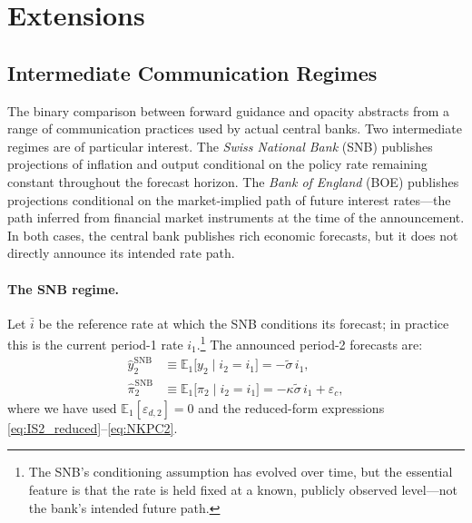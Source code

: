 
\section{Extensions}
\label{sec:extensions}

\subsection{Intermediate Communication Regimes}
\label{sec:intermediate}

The binary comparison between forward guidance and opacity abstracts from a range
of communication practices used by actual central banks. Two intermediate regimes
are of particular interest. The \emph{Swiss National Bank} (SNB) publishes
projections of inflation and output conditional on the policy rate remaining constant
throughout the forecast horizon. The \emph{Bank of England} (BOE) publishes
projections conditional on the market-implied path of future interest rates---the
path inferred from financial market instruments at the time of the announcement. In
both cases, the central bank publishes rich economic forecasts, but it does not
directly announce its intended rate path.

\paragraph{The SNB regime.}
Let $\bar{i}$ be the reference rate at which the SNB conditions its forecast; in
practice this is the current period-1 rate $i_1$.\footnote{The SNB's conditioning
assumption has evolved over time, but the essential feature is that the rate is held
fixed at a known, publicly observed level---not the bank's intended future path.}
The announced period-2 forecasts are:
\begin{align}
  \hat{y}_2^{\mathrm{SNB}}  &\equiv \mathbb{E}_1\bigl[y_2 \mid i_2 = i_1\bigr]
    = -\tilde{\sigma}\,i_1, \label{eq:y2hat_SNB}\\
  \hat{\pi}_2^{\mathrm{SNB}} &\equiv \mathbb{E}_1\bigl[\pi_2 \mid i_2 = i_1\bigr]
    = -\kappa\tilde{\sigma}\,i_1 + \varepsilon_c, \label{eq:pi2hat_SNB}
\end{align}
where we have used $\mathbb{E}_1[\varepsilon_{d,2}] = 0$ and the reduced-form
expressions \eqref{eq:IS2_reduced}--\eqref{eq:NKPC2}.

